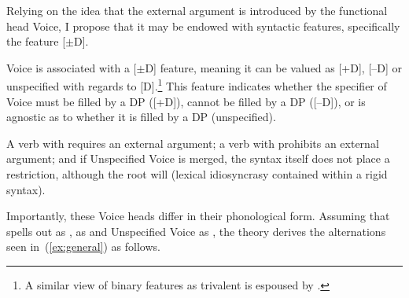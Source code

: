 \begin{exe}
\begin{xlist}
\begin{exe}
\begin{exe}
\begin{exe}
\begin{exe}
\begin{xlist}
\begin{exe}
\begin{xlist}
\begin{xlist}
\begin{xlist}
\begin{exe}
\begin{xlist}
\begin{exe}
\begin{exe}
\begin{exe}
\begin{exe}
\begin{xlist}
\begin{exe}
\begin{xlist}
\begin{exe}
\begin{exe}
\begin{xlist}
\begin{exe}
\begin{xlist}
\begin{exe}
\begin{xlist}
\begin{exe}
\begin{exe}
\begin{xlist}
\begin{exe}
\begin{exe}
\begin{xlist}
\begin{exe}
\begin{exe}
\begin{xlist}
\begin{exe}
\begin{exe}
\begin{xlist}
\begin{exe}
\begin{xlist}
\begin{exe}
\begin{exe}
\begin{exe}
\begin{exe}
\begin{xlist}
Relying on the idea that the external argument is introduced by the functional head Voice, I propose that it may be endowed with syntactic features, specifically the feature [$\pm$D].
 \begin{exe}
 \ex  {} 
 \begin{xlist} 
 	\ex  Voice is associated with a [$\pm$D] feature, meaning it can be valued as [+D], [--D] or unspecified with regards to [D].\footnote{A similar view of binary features as trivalent is espoused by \cite{harbour11}.} 
 	\ex  This feature indicates whether the specifier of Voice must be filled by a DP ([+D]), cannot be filled by a DP ([--D]), or is agnostic as to whether it is filled by a DP (unspecified). 
 \z
\z 

A verb with {\vd} requires an external argument; a verb with {\vz} prohibits an external argument; and if Unspecified Voice is merged, the syntax itself does not place a restriction, although the root will (lexical idiosyncrasy contained within a rigid syntax).

Importantly, these Voice heads differ in their phonological form. Assuming that {\vd} spells out as {\thif}, {\vz} as {\tnif} and Unspecified Voice as {\tkal}, the theory derives the alternations seen in~(\ref{ex:general}) as follows.


\end{xlist}
\end{exe}
\end{xlist}
\end{exe}
\end{exe}
\end{exe}
\end{exe}
\end{xlist}
\end{exe}
\end{xlist}
\end{exe}
\end{exe}
\end{xlist}
\end{exe}
\end{exe}
\end{xlist}
\end{exe}
\end{exe}
\end{xlist}
\end{exe}
\end{exe}
\end{xlist}
\end{exe}
\end{xlist}
\end{exe}
\end{xlist}
\end{exe}
\end{exe}
\end{xlist}
\end{exe}
\end{xlist}
\end{exe}
\end{exe}
\end{exe}
\end{exe}
\end{xlist}
\end{exe}
\end{xlist}
\end{xlist}
\end{xlist}
\end{exe}
\end{xlist}
\end{exe}
\end{exe}
\end{exe}
\end{exe}
\end{xlist}
\end{exe}
